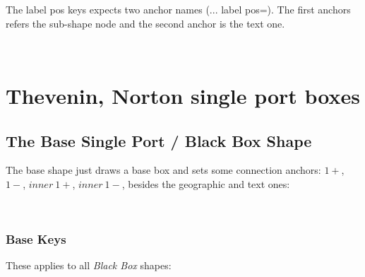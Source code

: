 \documentclass[10pt]{article}
\begin{document}
\begin{tsremark}
The label pos keys expects two anchor names (... label pos=). The first anchors refers the sub-shape node and the second anchor is the text one.
\end{tsremark}

~

\section{Thevenin, Norton single port boxes}


\subsection{The Base Single Port / Black Box Shape}\label{BBanchors}

The base shape just draws a base box and sets some connection anchors: $1+$, $1-$, $inner\ 1+$, $inner\ 1-$, besides the geographic and text ones:


\begin{center}%
\end{center}

        
~   

\subsubsection{Base Keys}\label{BBkeys}

These applies to all \emph{Black Box} shapes:
\end{document}
